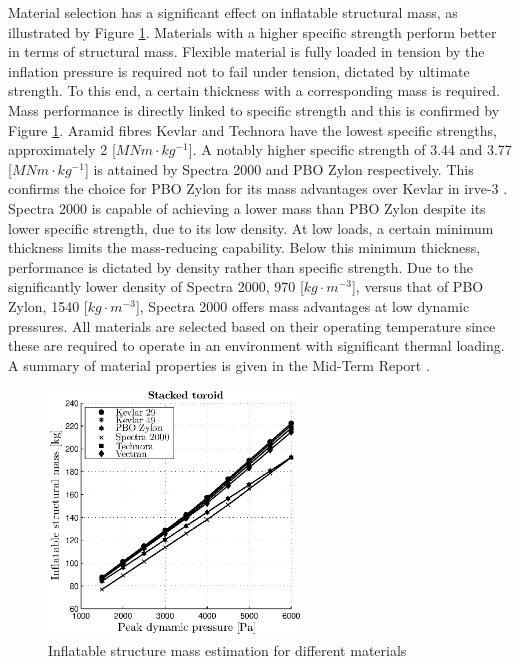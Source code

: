 Material selection has a significant effect on inflatable structural mass, as illustrated by Figure \ref{fig:mat}. Materials with a higher specific strength perform better in terms of structural mass. Flexible material is fully loaded in tension by the inflation pressure is required not to fail under tension, dictated by ultimate strength. To this end, a certain thickness with a corresponding mass is required. Mass performance is directly linked to specific strength and this is confirmed by Figure \ref{fig:mat}. Aramid fibres Kevlar and Technora have the lowest specific strengths, approximately 2 [$MNm \cdot kg^{-1}$]. A notably higher specific strength of 3.44 and 3.77 [$MNm \cdot kg^{-1}$] is attained by Spectra 2000 and PBO Zylon respectively. This confirms the choice for PBO Zylon for its mass advantages over Kevlar in \gls{irve}-3 \cite{Dillman2012a}. Spectra 2000 is capable of achieving a lower mass than PBO Zylon despite its lower specific strength, due to its low density. At low loads, a certain minimum thickness limits the mass-reducing capability. Below this minimum thickness, performance is dictated by density rather than specific strength. Due to the significantly lower density of Spectra 2000, 970 [$kg \cdot m^{-3}$], versus that of PBO Zylon, 1540 [$kg \cdot m^{-3}$], Spectra 2000 offers mass advantages at low dynamic pressures. All materials are selected based on their operating temperature since these are required to operate in an environment with significant thermal loading. A summary of material properties is given in the Mid-Term Report \cite[p.64]{Balasooriyan2015b}.

\begin{figure}[h]
	\centering
	\includegraphics[width=0.6\textwidth]{./Figure/Structure/material_test.eps}
	\caption{Inflatable structure mass estimation for different materials}
	\label{fig:mat}
\end{figure}

